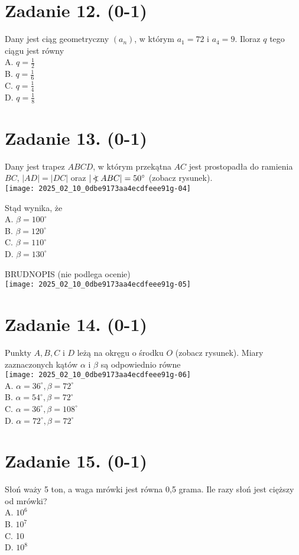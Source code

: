 \documentclass[10pt]{article}
\newcommand\Varangle{\mathop{{<\!\!\!\!\!\text{\small)}}\:}\nolimits}
\begin{document}
\section*{Zadanie 12. (0-1)}
Dany jest ciąg geometryczny \(\left(a_{n}\right)\), w którym \(a_{1}=72\) i \(a_{4}=9\). Iloraz \(q\) tego ciągu jest równy\\
A. \(q=\frac{1}{2}\)\\
B. \(q=\frac{1}{6}\)\\
C. \(q=\frac{1}{4}\)\\
D. \(q=\frac{1}{8}\)

\section*{Zadanie 13. (0-1)}
Dany jest trapez \(A B C D\), w którym przekątna \(A C\) jest prostopadła do ramienia \(B C\), \(|A D|=|D C|\) oraz \(|\Varangle A B C|=50^{\circ}\) (zobacz rysunek).\\
\texttt{[image: 2025\_02\_10\_0dbe9173aa4ecdfeee91g-04]}

Stąd wynika, że\\
A. \(\beta=100^{\circ}\)\\
B. \(\beta=120^{\circ}\)\\
C. \(\beta=110^{\circ}\)\\
D. \(\beta=130^{\circ}\)

BRUDNOPIS (nie podlega ocenie)\\
\texttt{[image: 2025\_02\_10\_0dbe9173aa4ecdfeee91g-05]}

\section*{Zadanie 14. (0-1)}
Punkty \(A, B, C\) i \(D\) leżą na okręgu o środku \(O\) (zobacz rysunek). Miary zaznaczonych kątów \(\alpha\) i \(\beta\) są odpowiednio równe\\
\texttt{[image: 2025\_02\_10\_0dbe9173aa4ecdfeee91g-06]}\\
A. \(\alpha=36^{\circ}, \beta=72^{\circ}\)\\
B. \(\alpha=54^{\circ}, \beta=72^{\circ}\)\\
C. \(\alpha=36^{\circ}, \beta=108^{\circ}\)\\
D. \(\alpha=72^{\circ}, \beta=72^{\circ}\)

\section*{Zadanie 15. (0-1)}
Słoń waży 5 ton, a waga mrówki jest równa 0,5 grama. Ile razy słoń jest cięższy od mrówki?\\
A. \(10^{6}\)\\
B. \(10^{7}\)\\
C. 10\\
D. \(10^{8}\)
\end{document}
